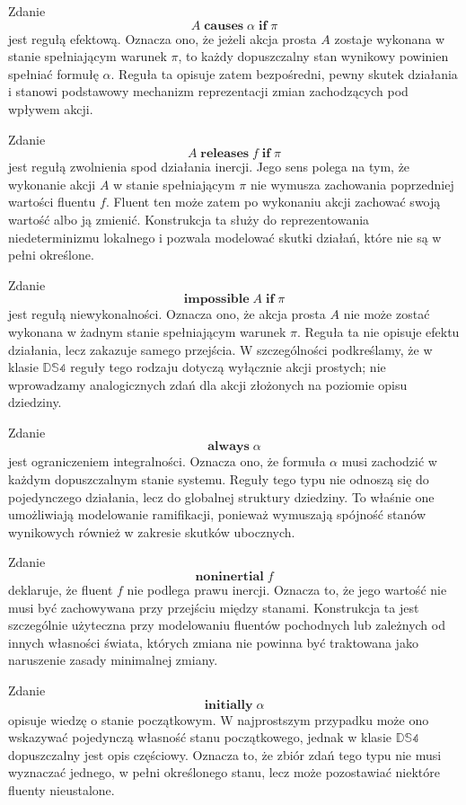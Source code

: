 \documentclass[11pt,a4paper]{article}
\theoremstyle{definition}
\begin{document}
Zdanie
\[
A \;\textbf{causes}\; \alpha \;\textbf{if}\; \pi
\]
jest regułą efektową. Oznacza ono, że jeżeli akcja prosta $A$ zostaje wykonana w stanie spełniającym warunek $\pi$, to każdy dopuszczalny stan wynikowy powinien spełniać formułę $\alpha$. Reguła ta opisuje zatem bezpośredni, pewny skutek działania i stanowi podstawowy mechanizm reprezentacji zmian zachodzących pod wpływem akcji.

Zdanie
\[
A \;\textbf{releases}\; f \;\textbf{if}\; \pi
\]
jest regułą zwolnienia spod działania inercji. Jego sens polega na tym, że wykonanie akcji $A$ w stanie spełniającym $\pi$ nie wymusza zachowania poprzedniej wartości fluentu $f$. Fluent ten może zatem po wykonaniu akcji zachować swoją wartość albo ją zmienić. Konstrukcja ta służy do reprezentowania niedeterminizmu lokalnego i pozwala modelować skutki działań, które nie są w pełni określone.

Zdanie
\[
\textbf{impossible}\; A \;\textbf{if}\; \pi
\]
jest regułą niewykonalności. Oznacza ono, że akcja prosta $A$ nie może zostać wykonana w żadnym stanie spełniającym warunek $\pi$. Reguła ta nie opisuje efektu działania, lecz zakazuje samego przejścia. W szczególności podkreślamy, że w klasie $\mathbb{DS4}$ reguły tego rodzaju dotyczą wyłącznie akcji prostych; nie wprowadzamy analogicznych zdań dla akcji złożonych na poziomie opisu dziedziny.

Zdanie
\[
\textbf{always}\; \alpha
\]
jest ograniczeniem integralności. Oznacza ono, że formuła $\alpha$ musi zachodzić w każdym dopuszczalnym stanie systemu. Reguły tego typu nie odnoszą się do pojedynczego działania, lecz do globalnej struktury dziedziny. To właśnie one umożliwiają modelowanie ramifikacji, ponieważ wymuszają spójność stanów wynikowych również w zakresie skutków ubocznych.

Zdanie
\[
\textbf{noninertial}\; f
\]
deklaruje, że fluent $f$ nie podlega prawu inercji. Oznacza to, że jego wartość nie musi być zachowywana przy przejściu między stanami. Konstrukcja ta jest szczególnie użyteczna przy modelowaniu fluentów pochodnych lub zależnych od innych własności świata, których zmiana nie powinna być traktowana jako naruszenie zasady minimalnej zmiany.

Zdanie
\[
\textbf{initially}\; \alpha
\]
opisuje wiedzę o stanie początkowym. W najprostszym przypadku może ono wskazywać pojedynczą własność stanu początkowego, jednak w klasie $\mathbb{DS4}$ dopuszczalny jest opis częściowy. Oznacza to, że zbiór zdań tego typu nie musi wyznaczać jednego, w pełni określonego stanu, lecz może pozostawiać niektóre fluenty nieustalone.
\end{document}
